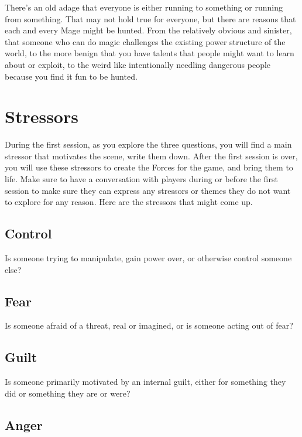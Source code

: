 \documentclass[
  oneside,
  statementpaper,
  9pt]{memoir}
\begin{document}
There's an old adage that everyone is either running to something or
running from something. That may not hold true for everyone, but there
are reasons that each and every Mage might be hunted. From the
relatively obvious and sinister, that someone who can do magic
challenges the existing power structure of the world, to the more benign
that you have talents that people might want to learn about or exploit,
to the weird like intentionally needling dangerous people because you
find it fun to be hunted.

\hypertarget{stressors}{%
\section{Stressors}\label{stressors}}

During the first session, as you explore the three questions, you will
find a main stressor that motivates the scene, write them down. After
the first session is over, you will use these stressors to create the
Forces for the game, and bring them to life. Make sure to have a
conversation with players during or before the first session to make
sure they can express any stressors or themes they do not want to
explore for any reason. Here are the stressors that might come up.

\hypertarget{control}{%
\subsection{Control}\label{control}}

Is someone trying to manipulate, gain power over, or otherwise control
someone else?

\hypertarget{fear}{%
\subsection{Fear}\label{fear}}

Is someone afraid of a threat, real or imagined, or is someone acting
out of fear?

\hypertarget{guilt}{%
\subsection{Guilt}\label{guilt}}

Is someone primarily motivated by an internal guilt, either for
something they did or something they are or were?

\hypertarget{anger}{%
\subsection{Anger}\label{anger}}
\end{document}
